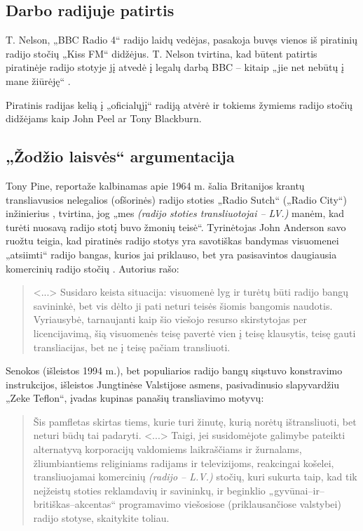 \documentclass[kursinis-darbas]{vukf}
\begin{document}
\subsection{Darbo radijuje patirtis}

T. Nelson, „\gls{BBC} Radio 4“ radijo laidų vedėjas, pasakoja buvęs vienos iš piratinių radijo stočių „Kiss FM“ didžėjus. T. Nelson tvirtina, kad būtent patirtis piratinėje radijo stotyje jį atvedė į legalų darbą \gls{BBC} – kitaip „jie net nebūtų į mane žiūrėję“ \cite{bbc_radio_4_do_pirates_rule_the_air_waves}.

Piratinis radijas kelią į „oficialųjį“ radiją atvėrė ir tokiems žymiems radijo stočių didžėjams kaip John Peel ar Tony Blackburn.

\subsection{„Žodžio laisvės“ argumentacija}

Tony Pine, reportaže kalbinamas apie 1964 m. šalia Britanijos krantų transliavusios nelegalios (ofšorinės) radijo stoties „Radio Sutch“ („Radio City“) inžinierius \cite{tony_pine}, tvirtina, jog „mes \emph{(radijo stoties transliuotojai – LV.)} manėm, kad turėti nuosavą radijo stotį buvo žmonių teisė“. Tyrinėtojas John Anderson savo ruožtu teigia, kad piratinės radijo stotys yra savotiškas bandymas visuomenei „atsiimti“ radijo bangas, kurios jai priklauso, bet yra pasisavintos daugiausia komercinių radijo stočių \cite[p.~1-2]{ja_a_can_of_worms_pirate_radio_as_public_intransigence_of_the_public_airwaves}. Autorius rašo:

\begin{quotation}
	<...> Susidaro keista situacija: visuomenė lyg ir turėtų būti radijo bangų savininkė, bet vis dėlto ji pati neturi teisės šiomis bangomis naudotis. Vyriausybė, tarnaujanti kaip šio viešojo resurso skirstytojas per licencijavimą, šią visuomenės teisę pavertė vien į teisę klausytis, teisę gauti transliacijas, bet ne į teisę pačiam transliuoti.
\end{quotation}

Senokos (išleistos 1994 m.), bet populiarios radijo bangų siųstuvo konstravimo instrukcijos, išleistos Jungtinėse Valstijose asmens, pasivadinusio slapyvardžiu „Zeke Teflon“, įvadas \cite{zt_complete_manual_of_pirate_radio} kupinas panašių transliavimo motyvų:

\begin{quotation}
	Šis pamfletas skirtas tiems, kurie turi žinutę, kurią norėtų ištransliuoti, bet neturi būdų tai padaryti. <...> Taigi, jei susidomėjote galimybe pateikti alternatyvą korporacijų valdomiems laikraščiams ir žurnalams, žliumbiantiems religiniams radijams ir televizijoms, reakcingai košelei, transliuojamai komercinių \emph{(radijo – L.V.)} stočių, kuri sukurta taip, kad tik neįžeistų stoties reklamdavių ir savininkų, ir beginklio „gyvūnai--ir--britiškas--akcentas“ programavimo viešosiose (priklausančiose valstybei) radijo stotyse, skaitykite toliau.
\end{quotation}
\end{document}
